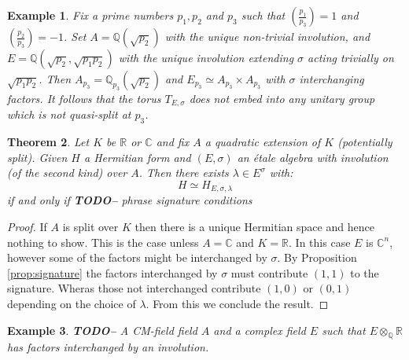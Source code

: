 \documentclass{article}
\theoremstyle{plain}
\newtheorem{theorem}{Theorem}[section]
\newtheorem{example}[theorem]{Example}
\theoremstyle{definition}
\numberwithin{equation}{section}
\newcommand{\RR}{\mathbb{R}}
\newcommand{\CC}{\mathbb{C}}
\newcommand{\QQ}{\mathbb{Q}}
\newcommand{\TODO}[1]{\textbf{TODO-#1}}
\begin{document}
\begin{example}
Fix a prime numbers $p_1,p_2$ and $p_3$ such that $\left(\tfrac{p_1}{p_3}\right) = 1$ and $\left(\tfrac{p_2}{p_3}\right) = -1$.
Set $A=\QQ(\sqrt{p_2})$ with the unique non-trivial involution, and $E=\QQ(\sqrt{p_2},\sqrt{p_1p_2})$ with the unique involution extending $\sigma$ acting trivially on $\sqrt{p_1p_2}$.
Then $A_{p_3} = \QQ_{p_3}(\sqrt{p_2})$ and $E_{p_3} \simeq A_{p_3} \times A_{p_3}$ with $\sigma$ interchanging factors.
It follows that the torus $T_{E,\sigma}$ does not embed into any unitary group which is not quasi-split at $p_3$.
\end{example}

\begin{theorem}
Let $K$ be $\RR$ or $\CC$ and fix $A$ a quadratic extension of $K$ (potentially split).
Given $H$ a Hermitian form and $(E,\sigma)$ an \'etale algebra with involution (of the second kind) over $A$. Then there exists $\lambda \in E^\sigma$ with:
\[ H \simeq H_{E,\sigma,\lambda} \]
if and only if 
\TODO - phrase signature conditions
\end{theorem}
\begin{proof}
If $A$ is split over $K$ then there is a unique Hermitian space and hence nothing to show.
This is the case unless $A=\CC$ and $K=\RR$. In this case $E$ is $\CC^n$, however some of the factors might be interchanged by $\sigma$.
By Proposition \ref{prop:signature} the factors interchanged by $\sigma$ must contribute $(1,1)$ to the signature.
Wheras those not interchanged contribute $(1,0)$ or $(0,1)$ depending on the choice of $\lambda$.
From this we conclude the result.
\end{proof}

\begin{example}
\TODO - A CM-field field $A$ and a complex field $E$ such that $E\otimes_\QQ \RR$ has factors interchanged by an involution.
\end{example}
\end{document}
